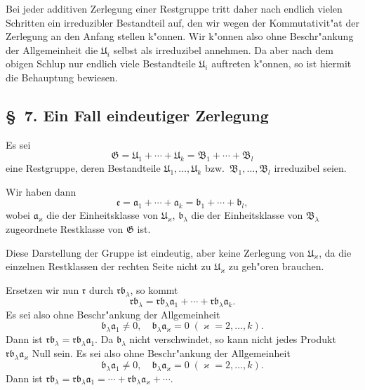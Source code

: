 \documentclass[12pt,a4paper]{article}
\begin{document}
Bei jeder additiven Zerlegung einer Restgruppe tritt daher nach endlich vielen Schritten ein irreduzibler Bestandteil auf, den wir wegen der Kommutativit"at der Zerlegung an den Anfang stellen k"onnen. Wir k"onnen also ohne Beschr"ankung der Allgemeinheit die $\mathfrak{U}_i$ selbst als irreduzibel annehmen. Da aber nach dem obigen Schlup nur endlich viele Bestandteile $\mathfrak{U}_i$ auftreten k"onnen, so ist hiermit die Behauptung bewiesen.

\subsection*{\S\ 7. Ein Fall eindeutiger Zerlegung}

Es sei
\[
\mathfrak{G} = \mathfrak{U}_1 + \cdots + \mathfrak{U}_k = \mathfrak{B}_1 + \cdots + \mathfrak{B}_l
\]
eine Restgruppe, deren Bestandteile $\mathfrak{U}_1,\ldots,\mathfrak{U}_k$ bzw.\ $\mathfrak{B}_1,\ldots,\mathfrak{B}_l$ irreduzibel seien.

Wir haben dann
\begin{equation}
\mathfrak{e} = \mathfrak{a}_1 + \cdots + \mathfrak{a}_k = \mathfrak{b}_1 + \cdots + \mathfrak{b}_l, \tag{22}
\end{equation}
wobei $\mathfrak{a}_\varkappa$ die der Einheitsklasse von $\mathfrak{U}_\varkappa$, $\mathfrak{b}_\lambda$ die der Einheitsklasse von $\mathfrak{B}_\lambda$ zugeordnete Restklasse von $\mathfrak{G}$ ist.

Diese Darstellung der Gruppe ist eindeutig, aber keine Zerlegung von $\mathfrak{U}_\varkappa$, da die einzelnen Restklassen der rechten Seite nicht zu $\mathfrak{U}_\varkappa$ zu geh"oren brauchen.

Ersetzen wir nun $\mathfrak{r}$ durch $\mathfrak{r}\mathfrak{b}_\lambda$, so kommt
\[
\mathfrak{r}\mathfrak{b}_\lambda = \mathfrak{r}\mathfrak{b}_\lambda\mathfrak{a}_1 + \cdots + \mathfrak{r}\mathfrak{b}_\lambda\mathfrak{a}_k.
\]
Es sei also ohne Beschr"ankung der Allgemeinheit
\begin{equation}
\mathfrak{b}_\lambda\mathfrak{a}_1 \neq 0, \quad \mathfrak{b}_\lambda\mathfrak{a}_\varkappa = 0 \; (\varkappa = 2,\ldots,k). \tag{23}
\end{equation}
Dann ist $\mathfrak{r}\mathfrak{b}_\lambda = \mathfrak{r}\mathfrak{b}_\lambda\mathfrak{a}_1$. Da $\mathfrak{b}_\lambda$ nicht verschwindet, so kann nicht jedes Produkt $\mathfrak{r}\mathfrak{b}_\lambda\mathfrak{a}_\varkappa$ Null sein. Es sei also ohne Beschr"ankung der Allgemeinheit
\[
\mathfrak{b}_\lambda\mathfrak{a}_1 \neq 0, \quad \mathfrak{b}_\lambda\mathfrak{a}_\varkappa = 0 \; (\varkappa = 2,\ldots,k).
\]
Dann ist $\mathfrak{r}\mathfrak{b}_\lambda = \mathfrak{r}\mathfrak{b}_\lambda\mathfrak{a}_1 = \cdots + \mathfrak{r}\mathfrak{b}_\lambda\mathfrak{a}_\varkappa + \cdots$.
\end{document}
